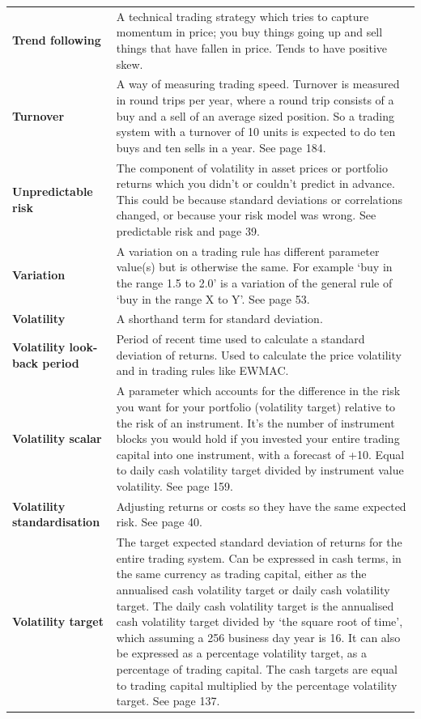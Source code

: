 {\begin{longtable}{@{}>{\raggedright\arraybackslash\bfseries} p{}>{\raggedright\arraybackslash} p{}@{}}
Trend following & A technical trading strategy which tries to capture momentum in price; you buy things going up and sell things that have fallen in price. Tends to have positive skew. \\[0.65em]
Turnover & A way of measuring trading speed. Turnover is measured in round trips per year, where a round trip consists of a buy and a sell of an average sized position. So a trading system with a turnover of 10 units is expected to do ten buys and ten sells in a year. See page 184. \\[0.65em]
Unpredictable risk & The component of volatility in asset prices or portfolio returns which you didn’t or couldn’t predict in advance. This could be because standard deviations or correlations changed, or because your risk model was wrong. See predictable risk and page 39. \\[0.65em]
Variation & A variation on a trading rule has different parameter value(s) but is otherwise the same. For example ‘buy in the range 1.5 to 2.0’ is a variation of the general rule of ‘buy in the range X to Y’. See page 53. \\[0.65em]
Volatility & A shorthand term for standard deviation. \\[0.65em]
Volatility look-back period & Period of recent time used to calculate a standard deviation of returns. Used to calculate the price volatility and in trading rules like EWMAC. \\[0.65em]
Volatility scalar & A parameter which accounts for the difference in the risk you want for your portfolio (volatility target) relative to the risk of an instrument. It’s the number of instrument blocks you would hold if you invested your entire trading capital into one instrument, with a forecast of +10. Equal to daily cash volatility target divided by instrument value volatility. See page 159. \\[0.65em]
Volatility standardisation & Adjusting returns or costs so they have the same expected risk. See page 40. \\[0.65em]
Volatility target & The target expected standard deviation of returns for the entire trading system. Can be expressed in cash terms, in the same currency as trading capital, either as the annualised cash volatility target or daily cash volatility target. The daily cash volatility target is the annualised cash volatility target divided by ‘the square root of time’, which assuming a 256 business day year is 16. It can also be expressed as a percentage volatility target, as a percentage of trading capital. The cash targets are equal to trading capital multiplied by the percentage volatility target. See page 137. \\[0.65em]
\end{longtable}
}
